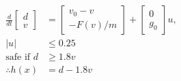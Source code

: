 \documentclass[preview]{standalone}
\begin{document}
\begin{align*}
\frac{d}{dt}\begin{bmatrix}d\\ v\end{bmatrix} &= \begin{bmatrix}v_0 - v\\ -F(v)/m\end{bmatrix} + \begin{bmatrix}0\\g_0\end{bmatrix}u, \\ |u| &\leq 0.25\\ \text{safe if } d &\geq 1.8 v\\ \therefore  h(x) &= d - 1.8 v
\end{align*}
\end{document}

